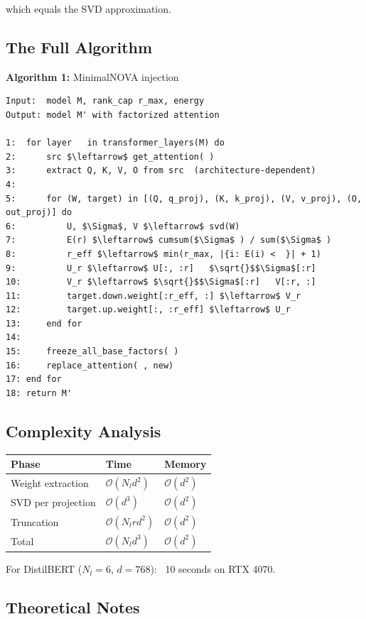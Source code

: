 which equals the SVD approximation.

\subsection{The Full Algorithm}

\textbf{Algorithm 1:} MinimalNOVA injection
\begin{lstlisting}
Input:  model M, rank_cap r_max, energy  
Output: model M' with factorized attention

1:  for layer   in transformer_layers(M) do
2:      src $\leftarrow$ get_attention( )
3:      extract Q, K, V, O from src  (architecture-dependent)
4:
5:      for (W, target) in [(Q, q_proj), (K, k_proj), (V, v_proj), (O, out_proj)] do
6:          U, $\Sigma$, V $\leftarrow$ svd(W)
7:          E(r) $\leftarrow$ cumsum($\Sigma$ ) / sum($\Sigma$ )
8:          r_eff $\leftarrow$ min(r_max, |{i: E(i) <  }| + 1)
9:          U_r $\leftarrow$ U[:, :r]   $\sqrt{}$$\Sigma$[:r]
10:         V_r $\leftarrow$ $\sqrt{}$$\Sigma$[:r]   V[:r, :]
11:         target.down.weight[:r_eff, :] $\leftarrow$ V_r
12:         target.up.weight[:, :r_eff] $\leftarrow$ U_r
13:     end for
14:
15:     freeze_all_base_factors( )
16:     replace_attention( , new)
17: end for
18: return M'
\end{lstlisting}

\subsection{Complexity Analysis}

\begin{table}[H]
\centering
\small
\begin{tabular}{lll}
\toprule
\textbf{Phase} & \textbf{Time} & \textbf{Memory} \\
\midrule
Weight extraction & $\mathcal{O}(N_l d^2)$ & $\mathcal{O}(d^2)$ \\
SVD per projection & $\mathcal{O}(d^3)$ & $\mathcal{O}(d^2)$ \\
Truncation & $\mathcal{O}(N_l r d^2)$ & $\mathcal{O}(d^2)$ \\
Total & $\mathcal{O}(N_l d^3)$ & $\mathcal{O}(d^2)$ \\
\bottomrule
\end{tabular}
\end{table}

For DistilBERT ($N_l = 6$, $d = 768$): ~10 seconds on RTX 4070.

\subsection{Theoretical Notes}

